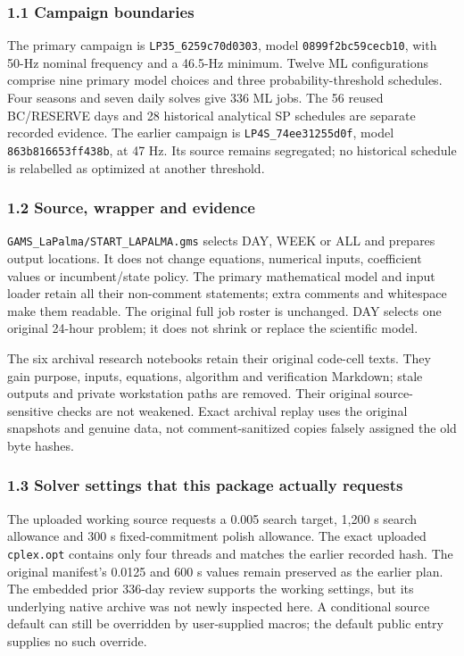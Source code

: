 \documentclass[
  11pt,
  a4paper,
]{article}
\begin{document}
\subsubsection{1.1 Campaign boundaries}\label{campaign-boundaries}

The primary campaign is \texttt{LP35\_6259c70d0303}, model
\texttt{0899f2bc59cecb10}, with 50-Hz nominal frequency and a 46.5-Hz
minimum. Twelve ML configurations comprise nine primary model choices
and three probability-threshold schedules. Four seasons and seven daily
solves give 336 ML jobs. The 56 reused BC/RESERVE days and 28 historical
analytical SP schedules are separate recorded evidence. The earlier
campaign is \texttt{LP4S\_74ee31255d0f}, model
\texttt{863b816653ff438b}, at 47 Hz. Its source remains segregated; no
historical schedule is relabelled as optimized at another threshold.

\subsubsection{1.2 Source, wrapper and
evidence}\label{source-wrapper-and-evidence}

\texttt{GAMS\_LaPalma/START\_LAPALMA.gms} selects DAY, WEEK or ALL and
prepares output locations. It does not change equations, numerical
inputs, coefficient values or incumbent/state policy. The primary
mathematical model and input loader retain all their non-comment
statements; extra comments and whitespace make them readable. The
original full job roster is unchanged. DAY selects one original 24-hour
problem; it does not shrink or replace the scientific model.

The six archival research notebooks retain their original code-cell
texts. They gain purpose, inputs, equations, algorithm and verification
Markdown; stale outputs and private workstation paths are removed. Their
original source-sensitive checks are not weakened. Exact archival replay
uses the original snapshots and genuine data, not comment-sanitized
copies falsely assigned the old byte hashes.

\subsubsection{1.3 Solver settings that this package actually
requests}\label{solver-settings-that-this-package-actually-requests}

The uploaded working source requests a 0.005 search target, 1,200 s
search allowance and 300 s fixed-commitment polish allowance. The exact
uploaded \texttt{cplex.opt} contains only four threads and matches the
earlier recorded hash. The original manifest's 0.0125 and 600 s values
remain preserved as the earlier plan. The embedded prior 336-day review
supports the working settings, but its underlying native archive was not
newly inspected here. A conditional source default can still be
overridden by user-supplied macros; the default public entry supplies no
such override.
\end{document}

